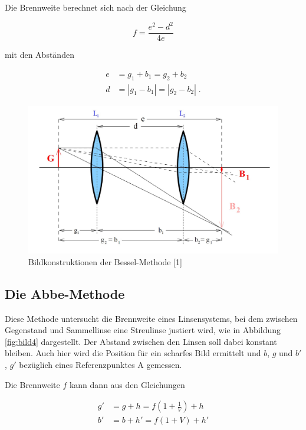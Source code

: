 Die Brennweite berechnet sich nach der Gleichung

\begin{equation}
    f = \frac{e^2 - d^2}{4e}
    \label{eqn:bessel}
\end{equation}

mit den Abständen 

\begin{align*}
    e &= g_1 + b_1 = g_2 + b_2 \\
    d &= |g_1 - b_1| = |g_2 - b_2| \; .
\end{align*}

\begin{figure} [H]
    \centering
    \includegraphics[scale=0.3]{content/bild3.png}
    \caption{Bildkonstruktionen der Bessel-Methode [1]}
    \label{fig:bild3}
  \end{figure}

  \subsection{Die Abbe-Methode}

  Diese Methode untersucht die Brennweite eines Linsensystems, bei dem zwischen Gegenstand
  und Sammellinse eine Streulinse justiert wird, wie in Abbildung \ref{fig:bild4}
  dargestellt. Der Abstand zwischen den Linsen soll dabei konstant bleiben.
  Auch hier wird die Position für ein scharfes Bild ermittelt und $b$, $g$ und $b'$, $g'$
  bezüglich eines Referenzpunktes A gemessen. 

  Die Brennweite $f$ kann dann aus den Gleichungen

  \begin{align}
      g' &= g + h = f \left( 1 + \frac{1}{V} \right) + h \\
      b' &= b + h' = f \left( 1 + V \right) + h'
      \label{eqn:abbe}
  \end{align}

